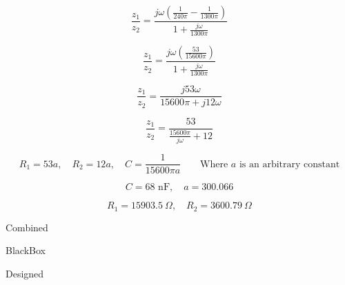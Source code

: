 \documentclass[12pt]{article} %
\begin{document}
\begin{equation}
	\frac{z_1}{z_2} = \frac{j\omega(\frac{1}{240\pi}-\frac{1}{1300\pi})}{1+\frac{j\omega}{1300\pi}}
\end{equation}

\begin{equation}
	\frac{z_1}{z_2} = \frac{j\omega(\frac{53}{15600\pi})}{1+\frac{j\omega}{1300\pi}}
\end{equation}

\begin{equation}
	\frac{z_1}{z_2} = \frac{j53\omega}{15600\pi+j12\omega}
\end{equation}

\begin{equation}
	\frac{z_1}{z_2} = \frac{53}{\frac{15600\pi}{j\omega}+12}
\end{equation}

\begin{equation}
	R_1 = 53a,\quad
	R_2 = 12a,\quad
	C = \frac{1}{15600\pi a}\quad\quad
	\textrm{Where }a\textrm{ is an arbitrary constant}
\end{equation}

\begin{equation}
	C = 68\textrm{ nF},\quad
	a = 300.066
\end{equation}

\begin{equation}
	R_1 = 15903.5\ \Omega,\quad
	R_2 = 3600.79\ \Omega
\end{equation}



\begin{table}[htb]
	\begin{center}
	\end{center}
	\caption{Combined}
\end{table}

\begin{table}[htb]
	\begin{center}
	\end{center}
	\caption{BlackBox}
\end{table}

\begin{table}[htb]
	\begin{center}
	\end{center}
	\caption{Designed}
\end{table}
\end{document}
